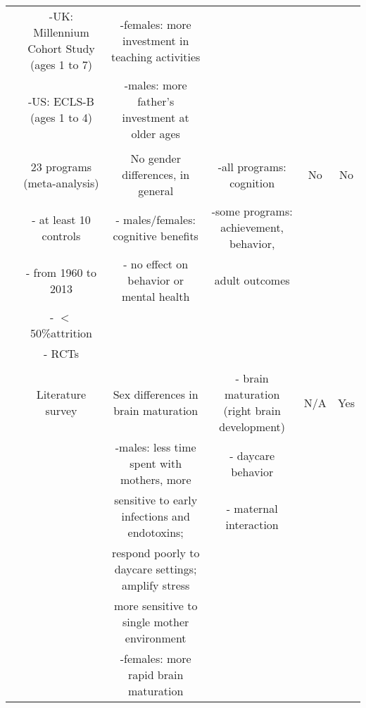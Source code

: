 \begin{tabular}{cccccc}
	&	-UK: Millennium Cohort Study (ages 1 to 7)	&	-females: more investment in teaching activities	&		&		&		\\ 
	&	-US: ECLS-B (ages 1 to 4)	&	-males: more father's investment at older ages	&		&		&		\\ \\ \midrule
\citet{Magnuson_Kelchen_Duncan_etal_2016_ECRQ}	&	23 programs (meta-analysis)	&	No gender differences, in general	&	-all programs: cognition	&	No	&	No	\\ 
	&	- at least 10 controls	&	- males/females: cognitive benefits	&	-some programs: achievement, behavior,	&		&		\\ 
	&	- from 1960 to 2013	&	- no effect on behavior or mental health	&	adult outcomes	&		&		\\ 
	&	- $<$ 50\%attrition	&		&		&		&		\\ 
	&	- RCTs	&		&		&		&		\\ \\ \midrule
\citet{Schore_2017_IMHJ}	&	Literature survey	&	Sex differences in brain maturation 	&	- brain maturation (right brain development)	&	N/A	&	Yes	\\ 
	&		&	-males: less time spent with mothers, more	&	- daycare behavior	&		&		\\ 
	&		&	sensitive to early infections and endotoxins; 	&	- maternal interaction 	&		&		\\ 
	&		&	respond poorly to daycare settings; amplify stress	&		&		&		\\ 
	&		&	more sensitive to single mother environment	&		&		&		\\ 
	&		&	-females: more rapid brain maturation	&		&		&		\\ \bottomrule
\end{tabular}											
